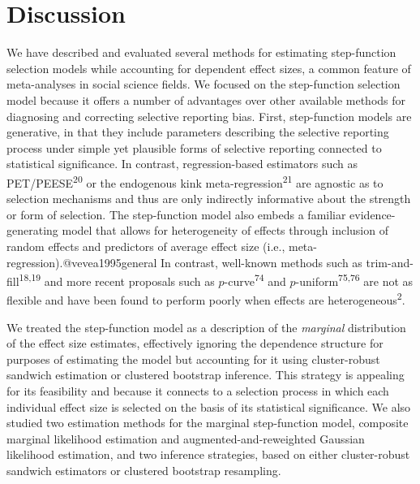 \documentclass[
  man, donotrepeattitle,floatsintext]{apa7}
\begin{document}
\section{Discussion}\label{discussion}

We have described and evaluated several methods for estimating step-function selection models while accounting for dependent effect sizes, a common feature of meta-analyses in social science fields.
We focused on the step-function selection model because it offers a number of advantages over other available methods for diagnosing and correcting selective reporting bias.
First, step-function models are generative, in that they include parameters describing the selective reporting process under simple yet plausible forms of selective reporting connected to statistical significance.
In contrast, regression-based estimators such as PET/PEESE\textsuperscript{20} or the endogenous kink meta-regression\textsuperscript{21} are agnostic as to selection mechanisms and thus are only indirectly informative about the strength or form of selection.
The step-function model also embeds a familiar evidence-generating model that allows for heterogeneity of effects through inclusion of random effects and predictors of average effect size (i.e., meta-regression).@vevea1995general
In contrast, well-known methods such as trim-and-fill\textsuperscript{18,19} and more recent proposals such as \(p\)-curve\textsuperscript{74} and \(p\)-uniform\textsuperscript{75,76} are not as flexible and have been found to perform poorly when effects are heterogeneous\textsuperscript{2}.

We treated the step-function model as a description of the \emph{marginal} distribution of the effect size estimates, effectively ignoring the dependence structure for purposes of estimating the model but accounting for it using cluster-robust sandwich estimation or clustered bootstrap inference.
This strategy is appealing for its feasibility and because it connects to a selection process in which each individual effect size is selected on the basis of its statistical significance.
We also studied two estimation methods for the marginal step-function model, composite marginal likelihood estimation and augmented-and-reweighted Gaussian likelihood estimation, and two inference strategies, based on either cluster-robust sandwich estimators or clustered bootstrap resampling.
\end{document}
